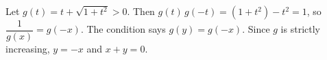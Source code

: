 Let $g(t)=t+\sqrt{1+t^2}>0$. Then $g(t)\,g(-t)=(1+t^2)-t^2=1$, so $\dfrac1{g(x)}=g(-x)$. The condition says $g(y)=g(-x)$. Since $g$ is strictly increasing, $y=-x$ and $x+y=\boxed{0}$.
